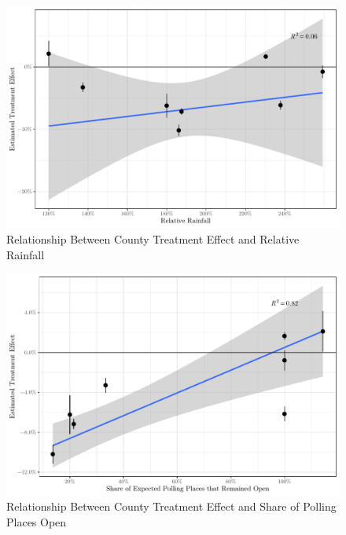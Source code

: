 \documentclass[
  12pt,
]{article}
\begin{document}
\begin{figure}[H]

{\centering \includegraphics{si_files/figure-latex/rain-chunk-1} 

}

\caption{\label{fig:rain-counties}Relationship Between County Treatment Effect and Relative Rainfall}\label{fig:rain-chunk}
\end{figure}

\begin{figure}[H]

{\centering \includegraphics{si_files/figure-latex/inter-chunk-1} 

}

\caption{\label{fig:inter-counties}Relationship Between County Treatment Effect and Share of Polling Places Open}\label{fig:inter-chunk}
\end{figure}
\end{document}
